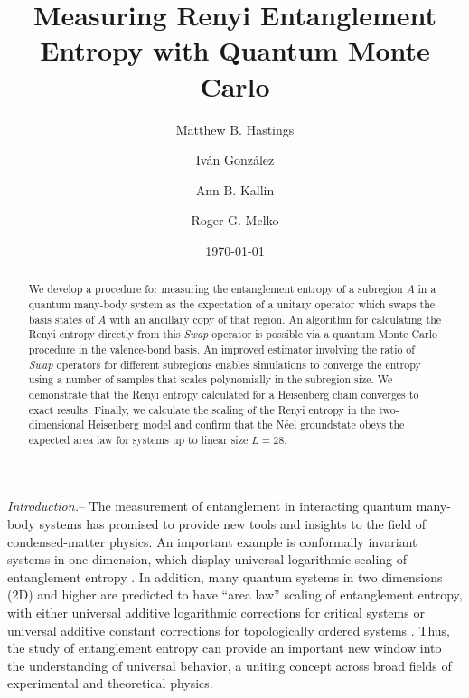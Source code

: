 \documentclass[prl,aps,twocolumn,floatfix,amsmath,amssymb,superscriptaddress,tightenlines]{revtex4}
\begin{document}
\date{\today}
\title{Measuring Renyi Entanglement Entropy with Quantum Monte Carlo}

\author{Matthew B. Hastings}

\author{Iv\'an Gonz\'alez}

\author{Ann B. Kallin}

\author{Roger G. Melko}

\begin{abstract} 
We develop a procedure for measuring the entanglement entropy of a subregion $A$ in a quantum
many-body system
as the expectation of a unitary operator which swaps the 
basis states of $A$ with an ancillary copy of that region.  An algorithm for
calculating the Renyi entropy directly from this {\it Swap} operator
is possible via a quantum Monte Carlo procedure in the valence-bond basis.
An improved estimator involving the ratio of {\it Swap} operators for different subregions enables simulations to converge
the entropy using a number of samples that 
scales polynomially in the subregion size.
We demonstrate that the Renyi entropy calculated for a Heisenberg chain  
converges to exact results. 
Finally, we 
calculate the scaling of the Renyi entropy in the two-dimensional Heisenberg model and confirm that the N\'eel 
groundstate obeys the expected area law for systems up to linear size $L=28$.
\end{abstract}
\maketitle

{\it Introduction.}-- 
The measurement of entanglement in interacting quantum many-body systems has promised to provide
new tools and insights to the field of condensed-matter physics.  An important example is conformally invariant
systems in one dimension, which display universal logarithmic
scaling of entanglement entropy \cite{Cardy}.  In addition, many
quantum systems in two dimensions (2D) and higher are predicted to have ``area law''
scaling of entanglement entropy, with
either universal additive logarithmic corrections for critical systems \cite{corner,ryu} or
universal additive constant corrections for topologically ordered systems \cite{KP,LW}.
Thus, the study of entanglement entropy can provide an important new 
window into the understanding of universal behavior, a uniting concept across broad fields of experimental and theoretical 
physics.
\end{document}

